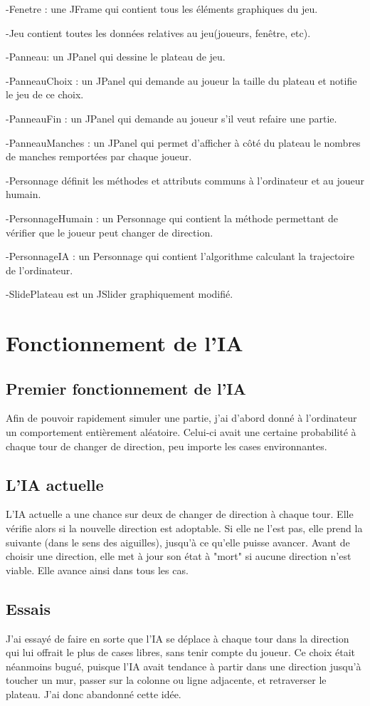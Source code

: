 \documentclass{report}
\begin{document}
-Fenetre : une JFrame qui contient tous les éléments graphiques du jeu.

-Jeu contient toutes les données relatives au jeu(joueurs, fenêtre, etc).

-Panneau: un JPanel qui dessine le plateau de jeu.

-PanneauChoix : un JPanel qui demande au joueur la taille du plateau et notifie le jeu de ce choix.

-PanneauFin : un JPanel qui demande au joueur s'il veut refaire une partie.

-PanneauManches : un JPanel qui permet d'afficher à côté du plateau le nombres de manches remportées par chaque joueur.

-Personnage définit les méthodes et attributs communs à l'ordinateur et au joueur humain.

-PersonnageHumain : un Personnage qui contient la méthode permettant de vérifier que le joueur peut changer de direction.

-PersonnageIA : un Personnage qui contient l'algorithme calculant la trajectoire de l'ordinateur.

-SlidePlateau est un JSlider graphiquement modifié.

\chapter{Fonctionnement de l'IA}
\section{Premier fonctionnement de l'IA}
Afin de pouvoir rapidement simuler une partie, j'ai d'abord donné à l'ordinateur un comportement entièrement aléatoire. Celui-ci avait une certaine probabilité à chaque tour de changer de direction, peu importe les cases environnantes.

\section{L'IA actuelle}
L'IA actuelle a une chance sur deux de changer de direction à chaque tour. Elle vérifie alors si la nouvelle direction est adoptable. Si elle ne l'est pas, elle prend la suivante (dans le sens des aiguilles), jusqu'à ce qu'elle puisse avancer. Avant de choisir une direction, elle met à jour son état à "mort" si aucune direction n'est viable. Elle avance ainsi dans tous les cas.

\section{Essais}
J'ai essayé de faire en sorte que l'IA se déplace à chaque tour dans la direction qui lui offrait le plus de cases libres, sans tenir compte du joueur. Ce choix était néanmoins bugué, puisque l'IA avait tendance à partir dans une direction jusqu'à toucher un mur, passer sur la colonne ou ligne adjacente, et retraverser le plateau. J'ai donc abandonné cette idée.
\end{document}
